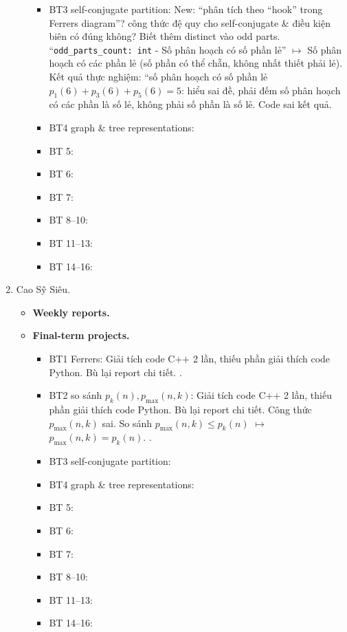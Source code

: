\documentclass{article}
\begin{document}
\begin{enumerate}
\begin{itemize}
\begin{itemize}
            \item BT3 self-conjugate partition: New: ``phân tích theo ``hook'' trong Ferrers diagram''? công thức đệ quy cho self-conjugate \& điều kiện biên có đúng không? Biết thêm distinct vào odd parts. ``\verb|odd_parts_count: int| - Số phân hoạch có số phần lẻ'' $\mapsto$ Số phân hoạch có các phần lẻ (số phần có thể chẵn, không nhất thiết phải lẻ). Kết quả thực nghiệm: ``số phân hoạch có số phần lẻ $p_1(6) + p_3(6) + p_5(6) = 5$: hiểu sai đề, phải đếm số phân hoạch có các phần là số lẻ, không phải số phần là số lẻ. Code sai kết quả.
            \item BT4 graph \& tree representations:
            \item BT 5:
            \item BT 6:
            \item BT 7:
            \item BT 8--10:
            \item BT 11--13:
            \item BT 14--16:
        \end{itemize}
    \end{itemize}
    \item {\sc Cao Sỹ Siêu.}
    \begin{itemize}
        \item {\bf Weekly reports.}
        \item {\bf Final-term projects.}
        \begin{itemize}
            \item BT1 Ferrers: Giải tích code C++ 2 lần, thiếu phần giải thích code Python. Bù lại report chi tiết. .
            \item BT2 so sánh $p_k(n),p_{\max}(n,k)$: Giải tích code C++ 2 lần, thiếu phần giải thích code Python. Bù lại report chi tiết. Công thức $p_{\max}(n,k)$ sai. So sánh \st{$p_{\max}(n,k)\le p_k(n)$} $\mapsto$ $p_{\max}(n,k) = p_k(n)$. .
            \item BT3 self-conjugate partition:
            \item BT4 graph \& tree representations:
            \item BT 5:
            \item BT 6:
            \item BT 7:
            \item BT 8--10:
            \item BT 11--13:
            \item BT 14--16:
        \end{itemize}

\end{itemize}
\end{enumerate}
\end{document}
